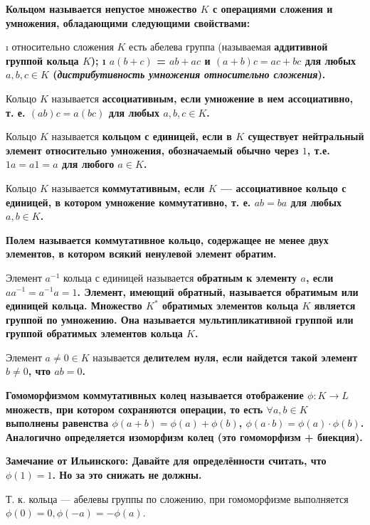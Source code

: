 

\date{}



\begin{defn}
\bf{Кольцом} называется непустое множество \(K\) с операциями сложения и умножения, обладающими следующими свойствами:

\begin{itemize}
\tightlist
\i
  относительно сложения \(K\) есть абелева группа (называемая \bf{аддитивной группой} кольца \(K\));
\i
  \(a(b+c)\) = \(ab+ac\) и \((a+b)c = ac+bc\) для любых \(a,b,c \in K\) (\emph{дистрибутивность умножения относительно сложения}).
\end{itemize}

Кольцо \(K\) называется \bf{ассоциативным}, если умножение в нем ассоциативно, т. е. \((ab)c = a(bc)\) для любых \(a, b, c \in K\).

Кольцо \(K\) называется \bf{кольцом с единицей}, если в \(K\) существует нейтральный элемент относительно умножения, обозначаемый обычно через \(1\), т.е. \(1a=a1=a\) для любого \(a\in K\).

Кольцо \(K\) называется \bf{коммутативным}, если \(K\) --- ассоциативное кольцо с единицей, в котором умножение коммутативно, т. е. \(ab = ba\) для любых \(a, b \in K\).

\bf{Полем} называется коммутативное кольцо, содержащее не менее двух элементов, в котором всякий ненулевой элемент обратим.
\end{defn}

\begin{defn}
Элемент \(a^{-1}\) кольца с единицей называется \bf{обратным} к элементу \(a\), если \(aa^{-1} = a^{-1}a = 1\). Элемент, имеющий обратный, называется \bf{обратимым} или \bf{единицей кольца}. Множество \(K^*\) обратимых элементов кольца \(K\) является группой по умножению. Она называется \bf{мультипликативной группой} или \bf{группой обратимых элементов} кольца \(K\).
\end{defn}

\begin{defn}
Элемент \(a\neq 0\in K\) называется \bf{делителем нуля}, если найдется такой элемент \(b \neq 0\), что \(ab=0\).
\end{defn}

\begin{defn}
\bf{Гомоморфизмом} коммутативных колец называется отображение \(\phi: K \to L\) множеств, при котором сохраняются операции, то есть \(\forall a,b \in K\) выполнены равенства \(\phi(a+b)=\phi(a)+\phi(b)\), \(\phi(a\cdot b)=\phi(a)\cdot \phi(b)\). Аналогично определяется \bf{изоморфизм} колец (это гомоморфизм + биекция).

\bf{Замечание от Ильинского:} Давайте для определённости считать, что $\phi(1)=1$. Но за это снижать не должны. 

Т. к. кольца --- абелевы группы по сложению, при гомоморфизме выполняется $\phi(0) = 0, \phi(-a) = -\phi(a)$.
\end{defn}

